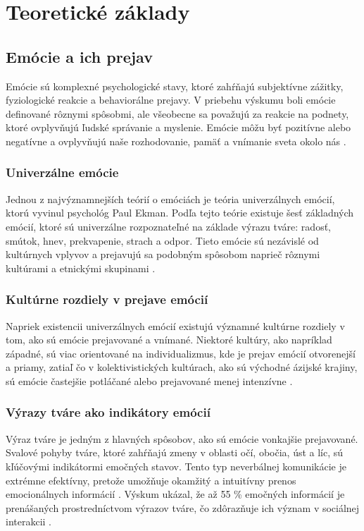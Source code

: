 \section{Teoretické základy}
\subsection{Emócie a ich prejav}
Emócie sú komplexné psychologické stavy, ktoré zahŕňajú subjektívne zážitky, fyziologické reakcie a behaviorálne prejavy. V priebehu výskumu boli emócie definované rôznymi spôsobmi, 
ale všeobecne sa považujú za reakcie na podnety, ktoré ovplyvňujú ľudské správanie a myslenie. Emócie môžu byť pozitívne alebo negatívne a ovplyvňujú naše rozhodovanie, pamäť a vnímanie sveta okolo nás \cite{article01}.
\subsubsection{Univerzálne emócie}
Jednou z najvýznamnejších teórií o emóciách je teória univerzálnych emócií, ktorú vyvinul psychológ Paul Ekman. Podľa tejto teórie existuje šesť základných emócií, ktoré sú univerzálne rozpoznateľné 
na základe výrazu tváre: radosť, smútok, hnev, prekvapenie, strach a odpor​. Tieto emócie sú nezávislé od kultúrnych vplyvov a prejavujú sa podobným spôsobom naprieč rôznymi kultúrami a etnickými skupinami \cite{article03}.
\subsubsection{Kultúrne rozdiely v prejave emócií}
Napriek existencii univerzálnych emócií existujú významné kultúrne rozdiely v tom, ako sú emócie prejavované a vnímané. Niektoré kultúry, ako napríklad západné, sú viac orientované na individualizmus, 
kde je prejav emócií otvorenejší a priamy, zatiaľ čo v kolektivistických kultúrach, ako sú východné ázijské krajiny, sú emócie častejšie potláčané alebo prejavované menej intenzívne​ \cite{article01}.
\subsubsection{Výrazy tváre ako indikátory emócií}
Výraz tváre je jedným z hlavných spôsobov, ako sú emócie vonkajšie prejavované. Svalové pohyby tváre, ktoré zahŕňajú zmeny v oblasti očí, obočia, úst a líc, sú kľúčovými indikátormi emočných stavov. 
Tento typ neverbálnej komunikácie je extrémne efektívny, pretože umožňuje okamžitý a intuitívny prenos emocionálnych informácií​ \cite{inProceedings01}. Výskum ukázal, že až 55 \% emočných informácií je 
prenášaných prostredníctvom výrazov tváre, čo zdôrazňuje ich význam v sociálnej interakcii​ \cite{article03}.
